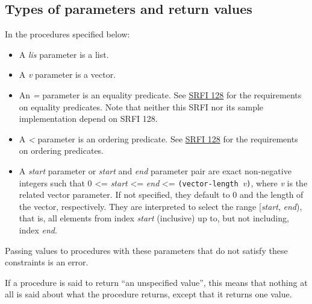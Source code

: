 \subsection{Types of parameters and return
values}\label{Typesofparametersandreturnvalues}

In the procedures specified below:

\begin{itemize}
\tightlist
\item
  A \emph{lis} parameter is a list.
\end{itemize}

\begin{itemize}
\tightlist
\item
  A \emph{v} parameter is a vector.
\end{itemize}

\begin{itemize}
\tightlist
\item
  An \emph{=} parameter is an equality predicate. See
  \href{http://srfi.schemers.org/srfi-128/srfi-128.html}{SRFI 128} for
  the requirements on equality predicates. Note that neither this SRFI
  nor its sample implementation depend on SRFI 128.
\end{itemize}

\begin{itemize}
\tightlist
\item
  A \emph{\textless{}} parameter is an ordering predicate. See
  \href{http://srfi.schemers.org/srfi-128/srfi-128.html}{SRFI 128} for
  the requirements on ordering predicates.
\end{itemize}

\begin{itemize}
\tightlist
\item
  A \emph{start} parameter or \emph{start} and \emph{end} parameter pair
  are exact non-negative integers such that 0 \textless{}= \emph{start}
  \textless{}= \emph{end} \textless{}=
  \texttt{(vector-length\ }\emph{v}\texttt{)}, where \emph{v} is the
  related vector parameter. If not specified, they default to 0 and the
  length of the vector, respectively. They are interpreted to select the
  range {[}\emph{start}, \emph{end}), that is, all elements from index
  \emph{start} (inclusive) up to, but not including, index \emph{end}.
\end{itemize}

Passing values to procedures with these parameters that do not satisfy
these constraints is an error.

If a procedure is said to return ``an unspecified value'', this means
that nothing at all is said about what the procedure returns, except
that it returns one value.


